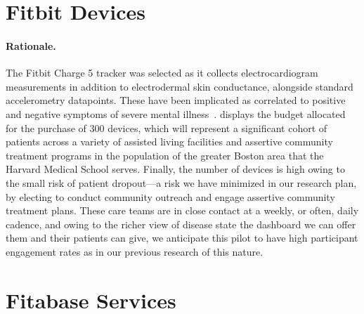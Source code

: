 \documentclass[twoside]{article}
\begin{document}
\section{Fitbit Devices} 
\paragraph{Rationale.} The Fitbit Charge 5 tracker was selected as it collects electrocardiogram measurements in addition to electrodermal skin conductance, alongside standard accelerometry datapoints. These have been implicated as correlated to positive and negative symptoms of severe mental illness~\cite{fonseka_wearables_2022}.  displays the budget allocated for the purchase of 300 devices, which will represent a significant cohort of patients across a variety of assisted living facilities and assertive community treatment programs in the population of the greater Boston area that the Harvard Medical School serves. Finally, the number of devices is high owing to the small risk of patient dropout---a risk we have minimized in our research plan, by electing to conduct community outreach and engage assertive community treatment plans. These care teams are in close contact at a weekly, or often, daily cadence, and owing to the richer view of disease state the dashboard we can offer them and their patients can give, we anticipate this pilot to have high participant engagement rates as in our previous research of this nature.

\section{Fitabase Services}
\end{document}
